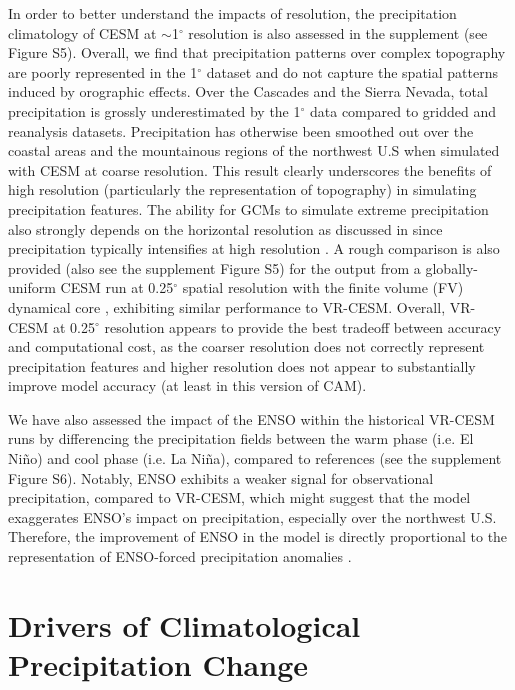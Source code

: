 \documentclass{ametsoc}
\begin{document}
 In order to better understand the impacts of resolution, the precipitation climatology of CESM at $\sim$1$^\circ$ resolution is also assessed in the supplement (see Figure S5). Overall, we find that precipitation patterns over complex topography are poorly represented in the 1$^\circ$ dataset and do not capture the spatial patterns induced by orographic effects. Over the Cascades and the Sierra Nevada, total precipitation is grossly underestimated by the 1$^\circ$ data compared to gridded and reanalysis datasets. Precipitation has otherwise been smoothed out over the coastal areas and the mountainous regions of the northwest U.S when simulated with CESM at coarse resolution.  This result clearly underscores the benefits of high resolution (particularly the representation of topography) in simulating precipitation features. The ability for GCMs to simulate extreme precipitation also strongly depends on the horizontal resolution as discussed in \cite{wehner2010effect} since precipitation typically intensifies at high resolution \citep{rauscher2016multimodel, o2016resolution}. A rough comparison is also provided (also see the supplement Figure S5) for the output from a globally-uniform CESM run at 0.25$^\circ$ spatial resolution with the finite volume (FV) dynamical core \citep{wehner2014effect}, exhibiting similar performance to VR-CESM. Overall, VR-CESM at 0.25$^\circ$ resolution appears to provide the best tradeoff between accuracy and computational cost, as the coarser resolution does not correctly represent precipitation features and higher resolution does not appear to substantially improve model accuracy (at least in this version of CAM).

We have also assessed the impact of the ENSO within the historical VR-CESM runs by differencing the precipitation fields between the warm phase (i.e. El Ni\~no) and cool phase (i.e. La Ni\~na), compared to references (see the supplement Figure S6). Notably, ENSO exhibits a weaker signal for observational precipitation, compared to VR-CESM, which might suggest that the model exaggerates ENSO's impact on precipitation, especially over the northwest U.S. Therefore, the improvement of ENSO in the model is directly proportional to the representation of ENSO-forced precipitation anomalies \citep{achutarao2006enso}.

\section{Drivers of Climatological Precipitation Change} \label{sec:ChangeDrivers}
\end{document}
